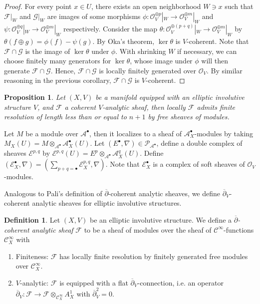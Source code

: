 \documentclass[12pt]{amsart}
\newtheorem{prop}[thm]{Proposition}
\theoremstyle{definition}
\newtheorem{defn}[thm]{Definition}
\theoremstyle{remark}
\numberwithin{equation}{section}
\newcommand{\del}{\partial}
\renewcommand{\del}{\partial}
\newcommand{\CA}{{\mathcal A}}
\newcommand{\CG}{{\mathcal G}}
\newcommand{\CF}{{\mathcal F}}
\newcommand{\CO}{{\mathcal O}}
\newcommand{\cinf}{{\mathcal C}^{\infty}}
\newcommand{\1}{{\mathbb{1}}}
\begin{document}
\begin{proof}
For every point $x\in U$, there exists an open neighborhood $W\ni x$ such that $\CF|_W$ and $\CG|_W$ are images of some morphisms $\phi: \CO_V^{\oplus p}|_W \to \CO_V^{\oplus m}|_W$ and $\psi: \CO_V^{\oplus q}|_W \to \CO_V^{\oplus m}|_W$ respectively. Consider the map $\theta: \CO_V^{\oplus (p+q)}|_W \to \CO_V^{\oplus m}|_W$ by $\theta(f\oplus g) = \phi(f) - \psi(g)$. By Oka's theorem, $\ker \theta$ is $V$-coherent. Note that $\CF \cap \CG$ is the image of $\ker \theta$ under $\phi$. With shrinking $W$ if necessary, we can choose finitely many generators for $\ker \theta$, whose image under $\phi$ will then generate $\CF\cap \CG$. Hence, $\CF\cap \CG$ is locally finitely generated over $\CO_V$. By similar reasoning in the previous corollary, $\CF\cap \CG$ is $V$-coherent.
\end{proof}


\begin{prop}
Let $(X, V)$ be a manifold equipped with an elliptic involutive structure $V$, and $\CF$ a coherent $V$-analytic sheaf, then locally $\CF$ admits finite resolution of length less than or equal to $n + 1$  by free sheaves of modules.
\end{prop}
Let $M$ be a module over $\CA^{\bullet}$, then it localizes to a sheaf of $\CA^{\bullet}_X$-modules by taking $M_X(U) = M \otimes_{\CA^{\bullet}} \CA^{\bullet}_X(U)$. Let $(E^{\bullet}, \nabla) \in \mathcal{P}_{\CA^{\bullet}}$, define a double complex of sheaves $\mathcal{E}^{p,q}$ by $\mathcal{E}^{p,q}(U) = E^p \otimes_{\CA^{\bullet}} \CA^{q}_X(U)$. Define $(\mathcal{E}_X^{\bullet}, \nabla) = (\sum_{p+q = \bullet} \mathcal{E}^{p,q}_X, \nabla)$. Note that $\mathcal{E}_X^{\bullet}$ is a complex of soft sheaves of $\CO_V$-modules.

Analogous to Pali's definition of $\overline{\del}$-coherent analytic sheaves, we define $\overline{\del}_V$-coherent analytic sheaves\index{coherent!$\overline{\del}_V$-coherent analytic sheaf} for elliptic involutive structures.
\begin{defn}
    Let $(X, V)$ be an elliptic involutive structure. We define a {\it $\overline{\del}$-coherent analytic sheaf} $\CF$ to be a sheaf of modules over the sheaf of $\cinf$-functions $\cinf_X$ with
    \begin{enumerate}
        \item Finiteness: $\CF$ has locally finite resolution by finitely generated free modules over $\cinf_X$.
        \item $V$-analytic: $\CF$ is equipped with a flat $\overline{\del}_V$-connection, i.e. an operator $\overline{\del}_V: \CF \to  \CF \otimes_{\cinf_X} A^1_X$ with $\overline{\del}_V^2 = 0$. 
    \end{enumerate}
\end{defn}
\end{document}
